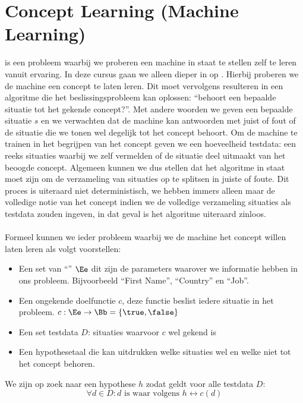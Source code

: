 \section{Concept Learning (Machine Learning)}
\label{s:conceptLearning}
 is een probleem waarbij we proberen een machine in staat te stellen zelf te leren vanuit ervaring. In deze cursus gaan we alleen dieper in op . Hierbij proberen we de machine een concept te laten leren. Dit moet vervolgens resulteren in een algoritme die het beslissingsprobleem kan oplossen: ``behoort een bepaalde situatie tot het gekende concept?''. Met andere woorden we geven een bepaalde situatie $s$ en we verwachten dat de machine kan antwoorden met juist of fout of de situatie die we tonen wel degelijk tot het concept behoort. Om de machine te trainen in het begrijpen van het concept geven we een hoeveelheid testdata: een reeks situaties waarbij we zelf vermelden of de situatie deel uitmaakt van het beoogde concept. Algemeen kunnen we dus stellen dat het algoritme in staat moet zijn om de verzameling van situaties op te splitsen in juiste of foute. Dit proces is uiteraard niet deterministisch, we hebben immers alleen maar de volledige notie van het concept indien we de volledige verzameling situaties als testdata zouden ingeven, in dat geval is het algoritme uiteraard zinloos.
\paragraph{}
Formeel kunnen we ieder probleem waarbij we de machine het concept willen laten leren als volgt voorstellen:
\begin{itemize}
 \item Een set van ``'' $\Ee$ dit zijn de parameters waarover we informatie hebben in ons probleem. Bijvoorbeeld ``First Name'', ``Country'' en ``Job''.
 \item Een ongekende doelfunctie $c$, deze functie beslist iedere situatie in het probleem. $c:\Ee\rightarrow\Bb=\left\{\true,\false\right\}$
 \item Een set testdata $D$: situaties waarvoor $c$ wel gekend is
 \item Een hypothesetaal die kan uitdrukken welke situaties wel en welke niet tot het concept behoren.
\end{itemize}
We zijn op zoek naar een hypothese $h$ zodat geldt voor alle testdata $D$:
\begin{equation}
\forall d\in D:d\mbox{ is waar volgens } h\leftrightarrow c\left(d\right)
\end{equation}
